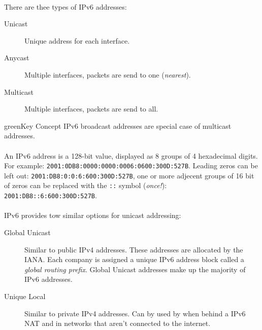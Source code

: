 \documentclass[10pt,landscape]{article}
\begin{document}
\begin{multicols}{3}
\paragraph{}
There are thee types of IPv6 addresses:
\begin{description}
	\item[Unicast] Unique address for each interface.
	\item[Anycast] Multiple interfaces, packets are send to one (\textit{nearest}).
	\item[Multicast] Multiple interfaces, packets are send to all.
\end{description}
\begin{textbox}{green}{Key Concept}
	IPv6 broadcast addresses are special case of multicast addresses.
\end{textbox}
\paragraph{}
An IPv6 address is a 128-bit value, displayed as 8 groups of 4 hexadecimal digits.
For example: \verb!2001:0DB8:0000:0000:0006:0600:300D:527B!.
Leading zeros can be left out: \verb!2001:DB8:0:0:6:600:300D:527B!, one or more adjecent groups
of 16 bit of zeros can be replaced with the \verb!::! symbol (\textit{once!}): \verb!2001:DB8::6:600:300D:527B!.
\paragraph{}
IPv6 provides tow similar options for unicast addressing:
\begin{description}
	\item[Global Unicast] Similar to public IPv4 addresses. These addresses are allocated by the IANA. Each company is assigned a unique IPv6 address block called a \textit{global routing prefix}. Global Unicast addresses make up the majority of IPv6 addresses.
	\item[Unique Local] Similar to private IPv4 addresses. Can by used by when behind a IPv6 NAT and in networks that aren't connected to the internet.
\end{description}

\end{multicols}
\end{document}
